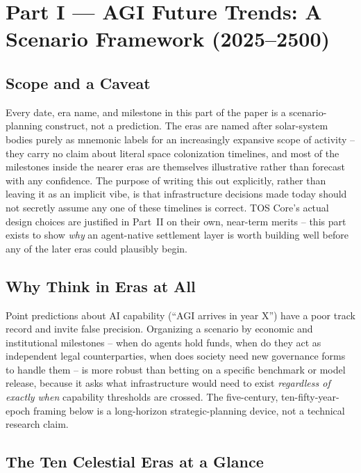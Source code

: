 \documentclass[11pt,oneside]{article}
\begin{document}
\newpage
\section{Part I --- AGI Future Trends: A Scenario Framework (2025--2500)}

\subsection{Scope and a Caveat}

Every date, era name, and milestone in this part of the paper is a scenario-planning
construct, not a prediction. The eras are named after solar-system bodies purely as
mnemonic labels for an increasingly expansive scope of activity -- they carry no claim about
literal space colonization timelines, and most of the milestones inside the nearer eras are
themselves illustrative rather than forecast with any confidence. The purpose of writing this
out explicitly, rather than leaving it as an implicit vibe, is that infrastructure decisions
made today should not secretly assume any one of these timelines is correct. TOS Core's
actual design choices are justified in Part~II on their own, near-term merits -- this part
exists to show \emph{why} an agent-native settlement layer is worth building well before any
of the later eras could plausibly begin.

\subsection{Why Think in Eras at All}

Point predictions about AI capability (``AGI arrives in year X'') have a poor track record and
invite false precision. Organizing a scenario by economic and institutional milestones --
when do agents hold funds, when do they act as independent legal counterparties, when does
society need new governance forms to handle them -- is more robust than betting on a specific
benchmark or model release, because it asks what infrastructure would need to exist
\emph{regardless of exactly when} capability thresholds are crossed. The five-century,
ten-fifty-year-epoch framing below is a long-horizon strategic-planning device, not a
technical research claim.

\subsection{The Ten Celestial Eras at a Glance}
\end{document}
